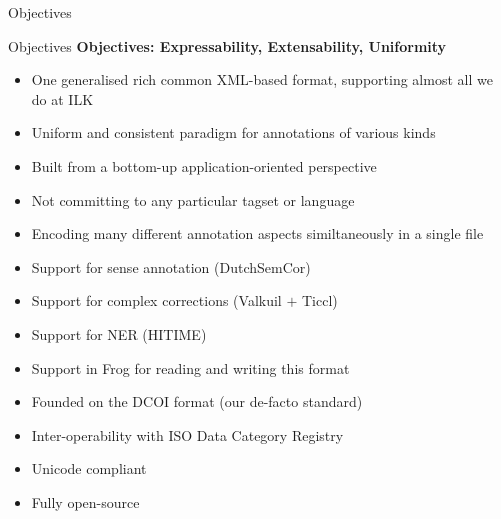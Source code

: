 \documentclass[compress]{beamer}
\begin{document}
\begin{frame}{Objectives}
    \begin{block}{Objectives}
        \textbf{Objectives: Expressability, Extensability, Uniformity}
        \begin{itemize}        
            \item One generalised rich common XML-based format, supporting almost all we do at ILK
            \item Uniform and consistent paradigm for annotations of various kinds
            \item Built from a bottom-up application-oriented perspective
            \item Not committing to any particular tagset or language            
            \item Encoding many different annotation aspects similtaneously in a single file
            \item Support for sense annotation (DutchSemCor)
            \item Support for complex corrections (Valkuil $+$ Ticcl)
            \item Support for NER (HITIME)
            \item Support in Frog for reading and writing this format            
            \item Founded on the DCOI format (our de-facto standard)
            \item Inter-operability with ISO Data Category Registry
            \item Unicode compliant
            \item Fully open-source
        \end{itemize}        
    \end{block}
\end{frame}
\end{document}
